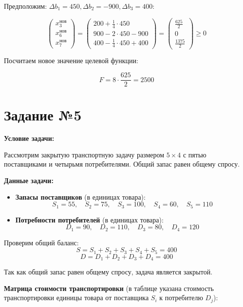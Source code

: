 \documentclass{article}
\begin{document}
Предположим: $\Delta b_1 = 450, \Delta b_2 = -900, \Delta b_3 = 400$:

\[
    \begin{pmatrix}
        x_3^{\text{нов}} \\
        x_6^{\text{нов}} \\
        x_7^{\text{нов}}
    \end{pmatrix}
    =
    \begin{pmatrix}
        200 + \frac{1}{4} \cdot 450 \\
        900 - 2 \cdot 450 - 900     \\
        400 - \frac{1}{4} \cdot 450 + 400
    \end{pmatrix} = \begin{pmatrix}
        \frac{625}{2} \\
        0             \\
        \frac{1375}{2}
    \end{pmatrix} \geq 0
\]

Посчитаем новое значение целевой функции:

\[
    F = 8 \cdot \frac{625}{2} = 2500
\]

\newpage
\section{Задание №5}
\textbf{Условие задачи:}

Рассмотрим закрытую транспортную задачу размером \(5 \times 4\) с пятью поставщиками и четырьмя потребителями. Общий запас равен общему спросу.

\textbf{Данные задачи:}

\begin{itemize}
    \item \textbf{Запасы поставщиков} (в единицах товара):
          \[
              S_1 = 55, \quad S_2 = 75, \quad S_3 = 100, \quad S_4 = 60, \quad S_5 = 110
          \]
    \item \textbf{Потребности потребителей} (в единицах товара):
          \[
              D_1 = 90, \quad D_2 = 110, \quad D_3 = 80, \quad D_4 = 120
          \]
\end{itemize}

Проверим общий баланс:
\[
    S = S_1 + S_2 + S_3 + S_4 + S_5 = 400
\]
\[
    D = D_1 + D_2 + D_3 + D_4 = 400
\]

Так как общий запас равен общему спросу, задача является закрытой.

\textbf{Матрица стоимости транспортировки} (в таблице указана стоимость транспортировки единицы товара от поставщика \(S_i\) к потребителю \(D_j\)):
\end{document}
